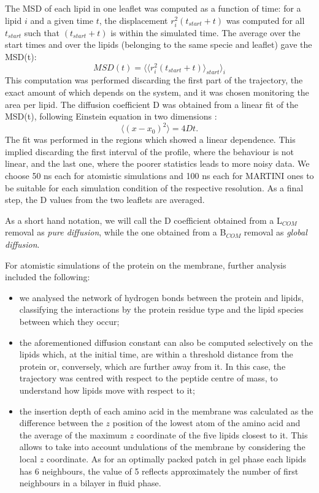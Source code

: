 \begin{itemize}
The MSD of each lipid in one leaflet was computed as a function of time: for a lipid $i$ and a given time $t$, the displacement $r_i^2(t_{start}+t)$ was computed for all $t_{start}$ such that $(t_{start}+t)$ is within the simulated time. The average over the start times and over the lipids (belonging to the same specie and leaflet) gave the MSD(t):
\begin{equation}
MSD(t) = \langle \langle r_i^2(t_{start}+t) \rangle_{start} \rangle_i
\end{equation}
This computation was performed discarding the first part of the trajectory, the exact amount of which depends on the system, and it was chosen monitoring the area per lipid.
The diffusion coefficient D was obtained from a linear fit of the MSD(t), following Einstein equation in two dimensions \citep{Einstein1956}:
\begin{equation}
\langle \left( x - x_0 \right)^2 \rangle = 4Dt.
\end{equation}
The fit was performed in the regions which showed a linear dependence. This implied discarding the first interval of the profile, where the behaviour is not linear, and the last one, where the poorer statistics leads to more noisy data. We choose 50 ns each for atomistic simulations and 100 ns each for MARTINI ones to be suitable for each simulation condition of the respective resolution. As a final step, the D values from the two leaflets are averaged.

As a short hand notation, we will call the D coefficient obtained from a L$_{COM}$ removal as \emph{pure diffusion}, while the one obtained from a B$_{COM}$ removal as \emph{global diffusion}.
\end{itemize}

For atomistic simulations of the protein on the membrane, further analysis included the following:
\begin{itemize}
\item we analysed the network of hydrogen bonds between the protein and lipids, classifying the interactions by the protein residue type and the lipid species between which they occur;
\item the aforementioned diffusion constant can also be computed selectively on the lipids which, at the initial time, are within a threshold distance from the protein or, conversely, which are further away from it. In this case, the trajectory was centred with respect to the peptide centre of mass, to understand how lipids move with respect to it;
\item the insertion depth of each amino acid in the membrane was calculated as the difference between the $z$ position of the lowest atom of the amino acid and the average of the maximum $z$ coordinate of the five lipids closest to it. This allows to take into account undulations of the membrane by considering the local $z$ coordinate. As for an optimally packed patch in gel phase each lipids has 6 neighbours, the value of 5 reflects approximately the number of first neighbours in a bilayer in fluid phase.
\end{itemize}


